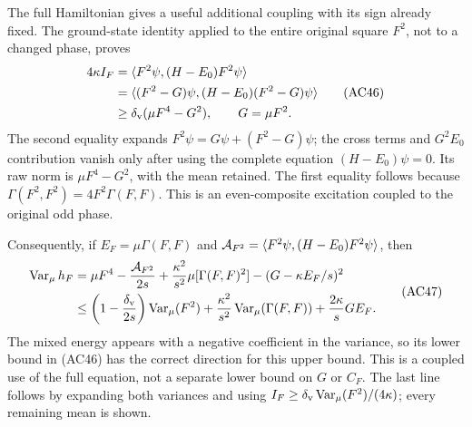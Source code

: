 \documentclass[11pt]{article}
\begin{document}
The full Hamiltonian gives a useful additional coupling with its sign already fixed. The ground-state identity applied to the entire original square \(F^2\), not to a changed phase, proves
\[
 \begin{aligned}
 4\kappa I_F
 &=\langle F^2\psi,(H-E_0)F^2\psi\rangle\\
 &=\langle (F^2-G)\psi,(H-E_0)(F^2-G)\psi\rangle\\
 &\ge\delta_{\rm v}(\mu F^4-G^2),\qquad G=\mu F^2 .
 \end{aligned}\tag{AC46}
\]
The second equality expands \(F^2\psi=G\psi+(F^2-G)\psi\); the cross terms and \(G^2E_0\) contribution vanish only after using the complete equation \((H-E_0)\psi=0\). Its raw norm is \(\mu F^4-G^2\), with the mean retained. The first equality follows because
\(\Gamma(F^2,F^2)=4F^2\Gamma(F,F)\). This is an even-composite excitation coupled to the original odd phase.

Consequently, if \(E_F=\mu\Gamma(F,F)\) and
\({\cal A}_{F^2}=\langle F^2\psi,(H-E_0)F^2\psi\rangle\), then
\[
 \begin{aligned}
 \operatorname{Var}_\mu h_F
 &=\mu F^4-\frac{{\cal A}_{F^2}}{2s}
       +\frac{\kappa^2}{s^2}\mu[\Gamma(F,F)^2]
       -(G-\kappa E_F/s)^2\\
 &\le\left(1-\frac{\delta_{\rm v}}{2s}\right)
             \operatorname{Var}_\mu(F^2)
       +\frac{\kappa^2}{s^2}\operatorname{Var}_\mu(\Gamma(F,F))
       +\frac{2\kappa}{s}G E_F .
 \end{aligned}\tag{AC47}
\]
The mixed energy appears with a negative coefficient in the variance, so its lower bound in (AC46) has the correct direction for this upper bound. This is a coupled use of the full equation, not a separate lower bound on \(G\) or \(C_F\). The last line follows by expanding both variances and using \(I_F\ge\delta_{\rm v}\operatorname{Var}_\mu(F^2)/(4\kappa)\); every remaining mean is shown.
\end{document}
